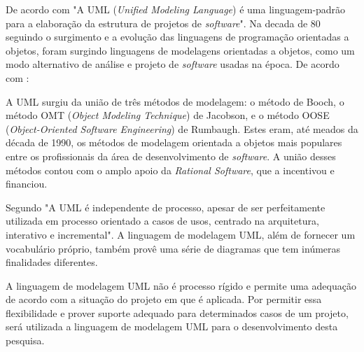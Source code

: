 		
	\par De acordo com  "A UML (\textit{Unified Modeling
Language}) é uma linguagem-padrão para a elaboração da estrutura de projetos
de \textit{software}". Na decada de 80 seguindo o surgimento e a evolução das
linguagens de programação orientadas a objetos, foram surgindo linguagens de
modelagens orientadas a objetos, como um modo alternativo de análise e projeto
de \textit{software} usadas na época. De acordo com
:
	\begin{citacao}
		A UML surgiu da união de três métodos de modelagem: o método de Booch, o
		método OMT (\textit{Object Modeling Technique}) de Jacobson, e o método OOSE
		(\textit{Object-Oriented Software Engineering}) de Rumbaugh. Estes eram, até
		meados da década de 1990, os métodos de modelagem orientada a objetos mais
		populares entre os profissionais da área de desenvolvimento de
		\textit{software}. A união desses métodos contou com o amplo apoio da
		\textit{Rational Software}, que a incentivou e financiou.
	\end{citacao}

	\par Segundo  "A UML é independente de processo,
apesar de ser perfeitamente utilizada em processo orientado a casos de usos,
centrado na arquitetura, interativo e incremental". A linguagem de modelagem
UML, além de fornecer um vocabulário próprio, também provê uma série de
diagramas que tem inúmeras finalidades diferentes. 
		
	
	\par A linguagem de modelagem UML não é processo rígido e permite uma
adequação de acordo com a situação do projeto em que é aplicada. Por permitir
essa flexibilidade e prover suporte adequado para determinados casos de um
projeto, será utilizada a linguagem de modelagem UML  para o desenvolvimento
desta pesquisa.